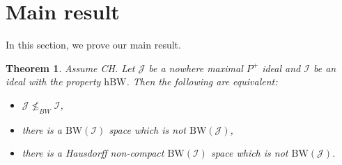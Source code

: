 \documentclass{amsart}
\theoremstyle{plain}
\newtheorem{theorem}{Theorem}[section]
\theoremstyle{definition}
\theoremstyle{remark}
\newcommand{\cI}{\mathcal{I}}
\newcommand{\I}{\cI}
\newcommand{\cJ}{\mathcal{J}}
\newcommand{\J}{\cJ}
\newcommand{\BW}{\mathrm{BW}}
\newcommand{\hBW}{\mathrm{hBW}}
\begin{document}
 


\section{Main result}
\label{sec:main}

In this section, we prove our main result.

\begin{theorem}
\label{thm:space}
Assume CH. Let $\J$ be a nowhere maximal $P^+$ ideal and $\I$ be an ideal with the property $\hBW$. Then the following are equivalent:
\begin{itemize}
    \item[(a)] $\J\not\leq_{BW}\I$,
    \item[(b)] there is a $\BW(\I)$ space which is not $\BW(\J)$,
    \item[(c)] there is a Hausdorff non-compact $\BW(\I)$ space which is not $\BW(\J)$.
\end{itemize}
\end{theorem}
\end{document}
